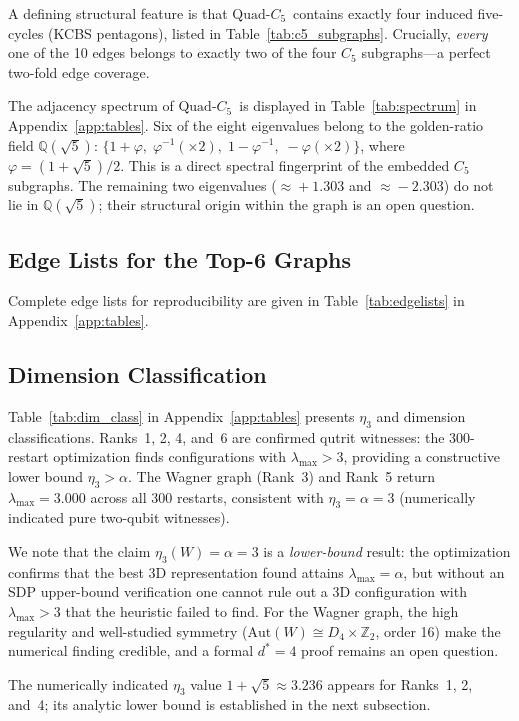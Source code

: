 \documentclass[aps,pra,twocolumn,superscriptaddress,longbibliography,floatfix]{revtex4-2}
\newcommand{\al}{\alpha}
\newcommand{\lmax}{\lambda_{\max}}
\newcommand{\QC}{\ensuremath{\text{Quad-}C_5}}
\begin{document}
A defining structural feature is that \QC\ contains exactly four
induced five-cycles (KCBS pentagons), listed in Table~\ref{tab:c5_subgraphs}.
Crucially, \emph{every} one of the 10 edges belongs to exactly two of the
four $C_5$ subgraphs---a perfect two-fold edge coverage.

The adjacency spectrum of \QC\ is displayed in
Table~\ref{tab:spectrum} in Appendix~\ref{app:tables}.
Six of the eight eigenvalues belong to the golden-ratio field
$\mathbb{Q}(\sqrt{5})$: $\{1+\varphi,\; \varphi^{-1}(\times 2),\;
1-\varphi^{-1},\; -\varphi(\times 2)\}$, where $\varphi=(1+\sqrt{5})/2$.
This is a direct spectral fingerprint of the embedded $C_5$ subgraphs.
The remaining two eigenvalues ($\approx\!+1.303$ and $\approx\!-2.303$)
do not lie in $\mathbb{Q}(\sqrt{5})$; their structural origin within
the graph is an open question.

\subsection{Edge Lists for the Top-6 Graphs}

Complete edge lists for reproducibility are given in
Table~\ref{tab:edgelists} in Appendix~\ref{app:tables}.

\subsection{Dimension Classification}
\label{sec:dim_class}

Table~\ref{tab:dim_class} in Appendix~\ref{app:tables} presents $\eta_3$ and dimension classifications.
Ranks~1, 2, 4, and~6 are confirmed qutrit witnesses: the 300-restart
optimization finds configurations with $\lmax>3$, providing a constructive
lower bound $\eta_3>\al$.
The Wagner graph (Rank~3) and Rank~5 return $\lmax=3.000$ across all 300
restarts, consistent with $\eta_3=\al=3$ (numerically indicated pure
two-qubit witnesses).

We note that the claim $\eta_3(W)=\al=3$ is a \emph{lower-bound} result:
the optimization confirms that the best 3D representation found attains
$\lmax=\al$, but without an SDP upper-bound verification one cannot rule out
a 3D configuration with $\lmax>3$ that the heuristic failed to find.
For the Wagner graph, the high regularity and well-studied symmetry
($\text{Aut}(W)\cong D_4\times\mathbb{Z}_2$, order 16) make the numerical
finding credible, and a formal $d^*=4$ proof remains an open question.

The numerically indicated $\eta_3$ value $1+\sqrt{5}\approx3.236$ appears
for Ranks~1, 2, and~4; its analytic lower bound is established in the
next subsection.
\end{document}
